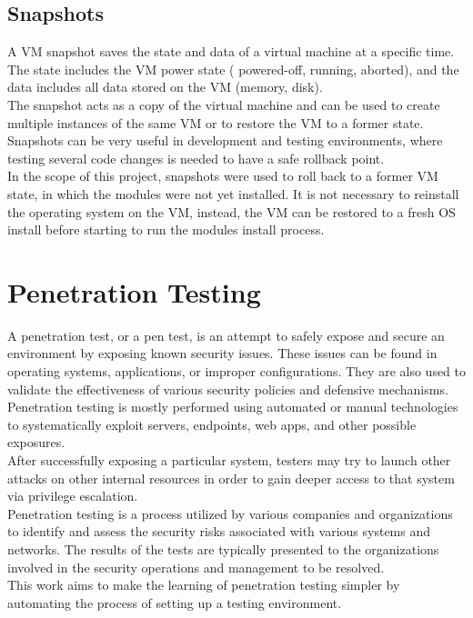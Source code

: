 \subsection{Snapshots}
A VM snapshot saves the state and data of a virtual machine at a specific time. The state includes the VM power state ( powered-off, running, aborted), and the data includes all data stored on the VM (memory, disk)\cite{vmware}.\\
The snapshot acts as a copy of the virtual machine and can be used to create multiple instances of the same VM or to restore the VM to a former state. Snapshots can be very useful in development and testing environments, where testing several code changes is needed to have a safe rollback point\cite{carklin_2021}.\\
In the scope of this project, snapshots were used to roll back to a former VM state, in which the modules were not yet installed. It is not necessary to reinstall the operating system on the VM, instead, the VM can be restored to a fresh OS install before starting to run the modules install process.


\section{Penetration Testing}
A penetration test, or a pen test, is an attempt to safely expose and secure an environment by exposing known security issues. These issues can be found in operating systems, applications, or improper configurations. They are also used to validate the effectiveness of various security policies and defensive mechanisms.\\
Penetration testing is mostly performed using automated or manual technologies to systematically exploit servers, endpoints, web apps, and other possible exposures.\\
After successfully exposing a particular system, testers may try to launch other attacks on other internal resources in order to gain deeper access to that system via privilege escalation.\\
Penetration testing is a process utilized by various companies and organizations to identify and assess the security risks associated with various systems and networks. The results of the tests are typically presented to the organizations involved in the security operations and management to be resolved\cite{pentest}.\\
This work aims to make the learning of penetration testing simpler by automating the process of setting up a testing environment.\\


